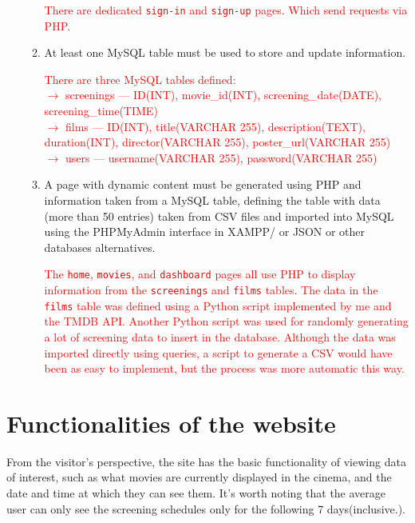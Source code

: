 \documentclass[a4paper]{article}
\begin{document}
\begin{enumerate}
\begin{enumerate}[label={$-$}]
            \textcolor{red}{There are dedicated \texttt{sign-in} and \texttt{sign-up}  pages. Which send requests via PHP.}
            \item At least one MySQL table must be used to store and update information.

            \textcolor{red}{There are three MySQL tables defined:\\$\rightarrow$ screenings --- ID(INT), movie\_id(INT), screening\_date(DATE), screening\_time(TIME)\\$\rightarrow$ films --- ID(INT), title(VARCHAR 255), description(TEXT), duration(INT), director(VARCHAR 255), poster\_url(VARCHAR 255)\\$\rightarrow$ users --- username(VARCHAR 255), password(VARCHAR 255)}
            \item A page with dynamic content must be generated using PHP and information taken from a MySQL table, defining the table with data (more than 50 entries) taken from CSV files and imported into MySQL using the PHPMyAdmin interface in XAMPP/ or JSON or other databases alternatives.

            \textcolor{red}{The \texttt{home}, \texttt{movies}, and \texttt{dashboard} pages all use PHP to display information from the \texttt{screenings} and \texttt{films} tables. The data in the \texttt{films} table was defined using a Python script implemented by me and the TMDB API. Another Python script was used for randomly generating a lot of screening data to insert in the database. Although the data was imported directly using queries, a script to generate a CSV would have been as easy to implement, but the process was more automatic this way.}
            \end{enumerate}
    \end{enumerate}

\section{Functionalities of the website}

From the visitor's perspective, the site has the basic functionality of viewing data of interest, such as what movies are currently displayed in the cinema, and the date and time at which they can see them. It's worth noting that the average user can only see the screening schedules only for the following 7 days(inclusive.).
\end{document}
